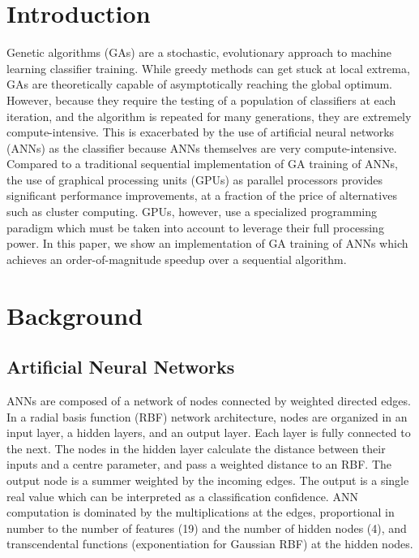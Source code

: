 \documentclass[11pt]{article}       %
\begin{document}
\section{Introduction} \label{intro}
Genetic algorithms (GAs) are a stochastic, evolutionary approach to machine learning classifier training. While greedy methods can get stuck at local extrema, GAs  are theoretically capable of asymptotically reaching the global optimum. However, because they require the testing of a population of classifiers at each iteration, and the algorithm is repeated for many generations, they are extremely compute-intensive. This is exacerbated by the use of artificial neural networks (ANNs) as the classifier because ANNs themselves are very compute-intensive. Compared to a traditional sequential implementation of GA training of ANNs, the use of graphical processing units (GPUs) as parallel processors provides significant performance improvements, at a fraction of the price of alternatives such as cluster computing. GPUs, however, use a specialized programming paradigm which must be taken into account to leverage their full processing power. In this paper, we show an implementation of GA training of ANNs which achieves an order-of-magnitude speedup over a sequential algorithm.

\section{Background} \label{background}

\subsection{Artificial Neural Networks} \label{ann}
ANNs are composed of a network of nodes connected by weighted directed edges. In a radial basis function (RBF) network architecture, nodes are organized in an input layer, a hidden layers, and an output layer. Each layer is fully connected to the next. The nodes in the hidden layer calculate the distance between their inputs and a centre parameter, and pass a weighted distance to an RBF. The output node is a summer weighted by the incoming edges. The output is a single real value which can be interpreted as a classification confidence. ANN computation is dominated by the multiplications at the edges, proportional in number to the number of features (19) and the number of hidden nodes (4), and transcendental functions (exponentiation for Gaussian RBF) at the hidden nodes.
\end{document}
